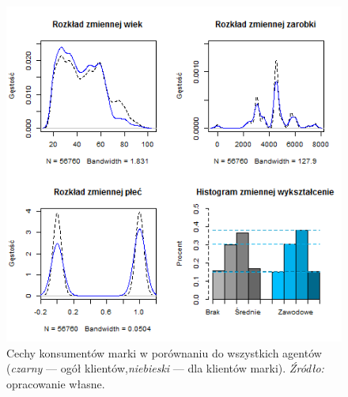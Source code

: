 \documentclass[polish, twoside, 12pt, a4paper]{article}
\theoremstyle{definition}
\theoremstyle{plain}
\theoremstyle{remark}
\begin{document}
\begin{figure}[hbt]
  \centering
    \includegraphics[width=\textwidth]{pictures/profile_klientow.png}
  \captionsetup{margin=10pt,font=small,labelfont=bf,width=.8\textwidth}
  \caption[Cechy konsumentów marki w porównaniu do wszystkich agentów]{Cechy konsumentów marki w porównaniu do wszystkich agentów (\textit{czarny} --- ogół klientów,\textit{niebieski} --- dla klientów marki). \textit{Źródło:} opracowanie własne.}\label{profile}
\end{figure}
\end{document}

